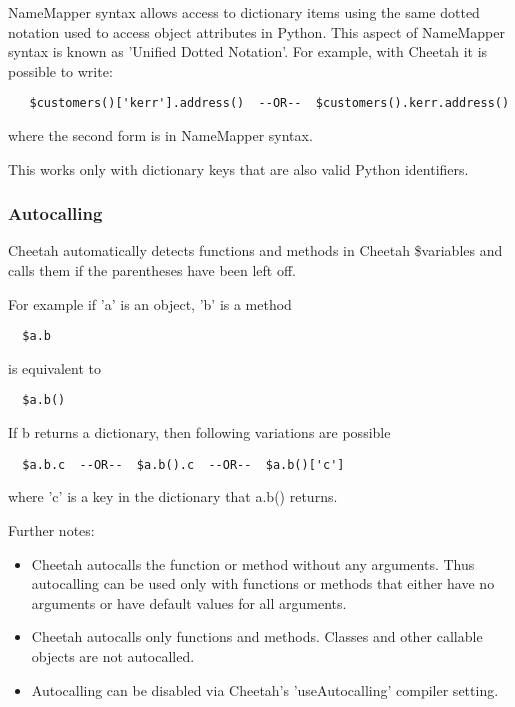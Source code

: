 NameMapper syntax allows access to dictionary items using the same dotted
notation used to access object attributes in Python.  This aspect of NameMapper
syntax is known as 'Unified Dotted Notation'.
For example, with Cheetah it is possible to write:
\begin{verbatim}
   $customers()['kerr'].address()  --OR--  $customers().kerr.address()
\end{verbatim}
where the second form is in NameMapper syntax.

This works only with dictionary keys that are also valid Python identifiers.

\subsubsection{Autocalling}
\label{language.namemapper.autocalling}

Cheetah automatically detects functions and methods in Cheetah \$variables and calls
them if the parentheses have been left off.  

For example if 'a' is an object, 'b' is a method
\begin{verbatim}
  $a.b
\end{verbatim}

is equivalent to

\begin{verbatim}
  $a.b()
\end{verbatim}

If b returns a dictionary, then following variations are possible
\begin{verbatim}
  $a.b.c  --OR--  $a.b().c  --OR--  $a.b()['c']
\end{verbatim}
where 'c' is a key in the dictionary that a.b() returns.

Further notes:
\begin{itemize}
\item Cheetah autocalls the function or method without any arguments.  Thus
autocalling can be used only with functions or methods that either have no
arguments or have default values for all arguments.

\item Cheetah autocalls only functions and methods.  Classes and other callable
objects are not autocalled.  

\item Autocalling can be disabled via Cheetah's 'useAutocalling' compiler
setting.
\end{itemize}

